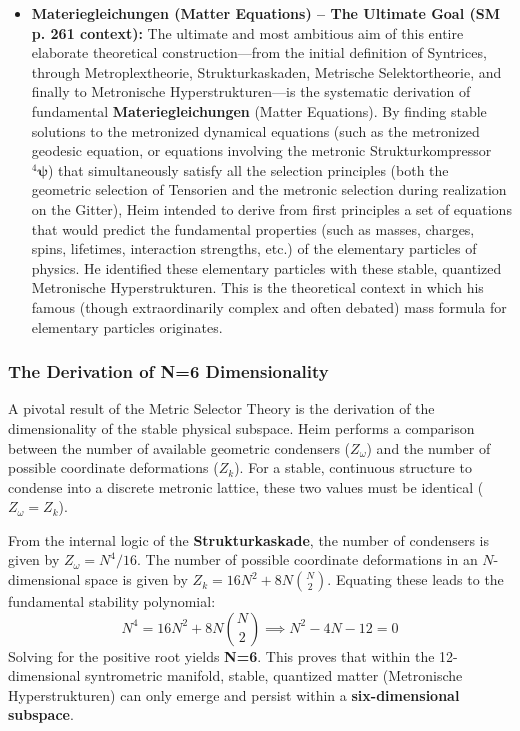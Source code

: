 \documentclass[12pt]{article}
\newcommand{\metronischerstrukturkompressor}{{}^4\bm{\psi}}
\begin{document}
\begin{itemize}
    \item \textbf{Materiegleichungen (Matter Equations) – The Ultimate Goal (SM p. 261 context):}
    The ultimate and most ambitious aim of this entire elaborate theoretical construction—from the initial definition of Syntrices, through Metroplextheorie, Strukturkaskaden, Metrische Selektortheorie, and finally to Metronische Hyperstrukturen—is the systematic derivation of fundamental \textbf{Materiegleichungen} (Matter Equations). By finding stable solutions to the metronized dynamical equations (such as the metronized geodesic equation, or equations involving the metronic Strukturkompressor \( \metronischerstrukturkompressor \)) that simultaneously satisfy all the selection principles (both the geometric selection of Tensorien and the metronic selection during realization on the Gitter), Heim intended to derive from first principles a set of equations that would predict the fundamental properties (such as masses, charges, spins, lifetimes, interaction strengths, etc.) of the elementary particles of physics. He identified these elementary particles with these stable, quantized Metronische Hyperstrukturen. This is the theoretical context in which his famous (though extraordinarily complex and often debated) mass formula for elementary particles originates.
\end{itemize}

\subsubsection*{The Derivation of N=6 Dimensionality}
A pivotal result of the Metric Selector Theory is the derivation of the dimensionality of the stable physical subspace. Heim performs a comparison between the number of available geometric condensers ($Z_\omega$) and the number of possible coordinate deformations ($Z_k$). For a stable, continuous structure to condense into a discrete metronic lattice, these two values must be identical ($Z_\omega = Z_k$). 

From the internal logic of the \textbf{Strukturkaskade}, the number of condensers is given by $Z_\omega = N^4 / 16$. The number of possible coordinate deformations in an $N$-dimensional space is given by $Z_k = 16N^2 + 8N\binom{N}{2}$. Equating these leads to the fundamental stability polynomial:
\begin{equation}
N^4 = 16N^2 + 8N\binom{N}{2} \implies N^2 - 4N - 12 = 0
\tag{SM p. 297}
\end{equation}
Solving for the positive root yields \textbf{N=6}. This proves that within the 12-dimensional syntrometric manifold, stable, quantized matter (Metronische Hyperstrukturen) can only emerge and persist within a \textbf{six-dimensional subspace}.
\end{document}
